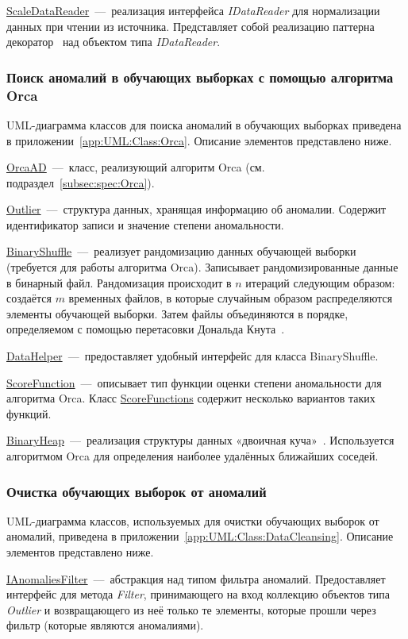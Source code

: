 \uline{ScaleDataReader}~---~реализация интерфейса \textit{IDataReader} для нормализации данных при чтении из источника. Представляет собой реализацию паттерна декоратор~\cite{GangOfFourDesignPatterns} над объектом типа \textit{IDataReader}.

\subsubsection{Поиск аномалий в обучающих выборках с помощью алгоритма Orca}
UML-диаграмма классов для поиска аномалий в обучающих выборках приведена в приложении~\ref{app:UML:Class:Orca}. Описание элементов представлено ниже.

\uline{OrcaAD}~---~класс, реализующий алгоритм Orca (см. подраздел~\ref{subsec:spec:Orca}).

\uline{Outlier}~---~структура данных, хранящая информацию об аномалии. Содержит идентификатор записи и значение степени аномальности.

\uline{BinaryShuffle}~---~реализует рандомизацию данных обучающей выборки (требуется для работы алгоритма Orca). Записывает рандомизированные данные в бинарный файл. Рандомизация происходит в $n$ итераций следующим образом: создаётся $m$ временных файлов, в которые случайным образом распределяются элементы обучающей выборки. Затем файлы объединяются в порядке, определяемом с помощью перетасовки Дональда Кнута~\cite{KnuthSeminumAlgo}.

\uline{DataHelper}~---~предоставляет удобный интерфейс для класса BinaryShuffle.

\uline{ScoreFunction}~---~описывает тип функции оценки степени аномальности для алгоритма Orca. Класс \uline{ScoreFunctions} содержит несколько вариантов таких функций.

\uline{BinaryHeap}~---~реализация структуры данных «двоичная куча»~\cite{AlgorithmsCormen}. Используется алгоритмом Orca для определения наиболее удалённых ближайших соседей.

\subsubsection{Очистка обучающих выборок от аномалий}
UML-диаграмма классов, используемых для очистки обучающих выборок от аномалий, приведена в приложении~\ref{app:UML:Class:DataCleansing}. Описание элементов представлено ниже.

\uline{IAnomaliesFilter}~---~абстракция над типом фильтра аномалий. Предоставляет интерфейс для метода \textit{Filter}, принимающего на вход коллекцию объектов типа \textit{Outlier} и возвращающего из неё только те элементы, которые прошли через фильтр (которые являются аномалиями).

